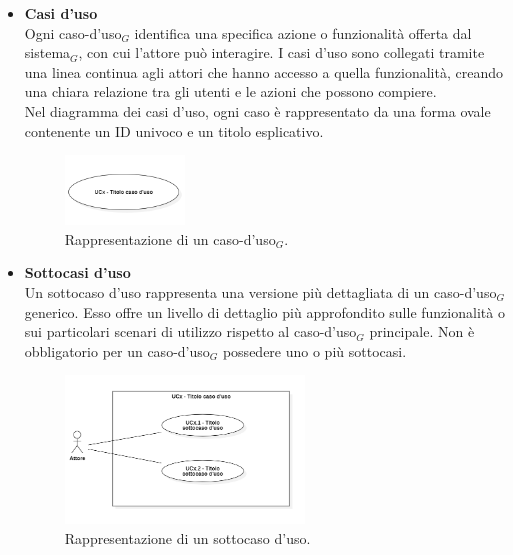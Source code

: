 \documentclass[10pt]{article}
\begin{document}
\begin{justify}
\begin{itemize}
            \item \textbf{Casi d'uso}\\
            Ogni caso-d'uso$_G$ identifica una specifica azione o funzionalità offerta dal sistema$_G$, con cui l'attore può interagire. I casi d'uso sono collegati tramite una linea continua agli attori che hanno accesso a quella funzionalità, creando una chiara relazione tra gli utenti e le azioni che possono compiere.\\
            Nel diagramma dei casi d'uso, ogni caso è rappresentato da una forma ovale contenente un ID univoco e un titolo esplicativo.
            \begin{figure}[H]
            \centering
            \includegraphics[width=0.30\textwidth]{UC.PNG}
            \caption{Rappresentazione di un caso-d'uso$_G$.}
            \end{figure}

            \item \textbf{Sottocasi d'uso}\\
            Un sottocaso d'uso rappresenta una versione più dettagliata di un caso-d'uso$_G$  generico. Esso offre un livello di dettaglio più approfondito sulle funzionalità o sui particolari scenari di utilizzo rispetto al caso-d'uso$_G$ principale. Non è obbligatorio per un caso-d'uso$_G$ possedere uno o più sottocasi.
            \begin{figure}[H]
            \centering
            \includegraphics[width=0.6\textwidth]{SottoUC.PNG}
            \caption{Rappresentazione di un sottocaso d'uso.}
            \end{figure}


\end{itemize}
\end{justify}
\end{document}
